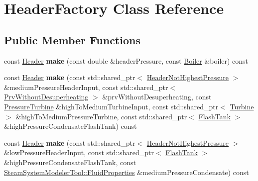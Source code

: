 \hypertarget{class_header_factory}{}\section{Header\+Factory Class Reference}
\label{class_header_factory}
\subsection*{Public Member Functions}
\begin{DoxyCompactItemize}
\item 
\mbox{\label{class_header_factory_ab7968fee2aa5304d4b0d1a606c951671}} 
const \hyperlink{class_header}{Header} {\bfseries make} (const double \&header\+Pressure, const \hyperlink{class_boiler}{Boiler} \&boiler) const
\item 
\mbox{\label{class_header_factory_a0a96f7d058915a2fa5da60d1d692e9c9}} 
const \hyperlink{class_header}{Header} {\bfseries make} (const std\+::shared\+\_\+ptr$<$ \hyperlink{class_header_not_highest_pressure}{Header\+Not\+Highest\+Pressure} $>$ \&medium\+Pressure\+Header\+Input, const std\+::shared\+\_\+ptr$<$ \hyperlink{class_prv_without_desuperheating}{Prv\+Without\+Desuperheating} $>$ \&prv\+Without\+Desuperheating, const \hyperlink{class_pressure_turbine}{Pressure\+Turbine} \&high\+To\+Medium\+Turbine\+Input, const std\+::shared\+\_\+ptr$<$ \hyperlink{class_turbine}{Turbine} $>$ \&high\+To\+Medium\+Pressure\+Turbine, const std\+::shared\+\_\+ptr$<$ \hyperlink{class_flash_tank}{Flash\+Tank} $>$ \&high\+Pressure\+Condensate\+Flash\+Tank) const
\item 
\mbox{\label{class_header_factory_a7c1816cf897aed67139457dccd6b25d9}} 
const \hyperlink{class_header}{Header} {\bfseries make} (const std\+::shared\+\_\+ptr$<$ \hyperlink{class_header_not_highest_pressure}{Header\+Not\+Highest\+Pressure} $>$ \&low\+Pressure\+Header\+Input, const std\+::shared\+\_\+ptr$<$ \hyperlink{class_flash_tank}{Flash\+Tank} $>$ \&high\+Pressure\+Condensate\+Flash\+Tank, const \hyperlink{struct_steam_system_modeler_tool_1_1_fluid_properties}{Steam\+System\+Modeler\+Tool\+::\+Fluid\+Properties} \&medium\+Pressure\+Condensate) const
\item 
\mbox{\label{class_header_factory_a4de4da6bbf02a25cc1ff78a9f1c7fbe0}} 

\end{DoxyCompactItemize}
